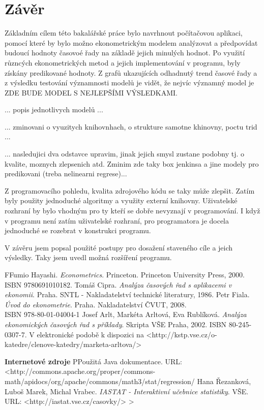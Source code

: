 \documentclass[a4paper,12pt,twoside]{scrreprt}
\begin{document}
\chapter*{Závěr}

Základním cílem této bakalářské práce bylo navrhnout počítačovou aplikaci, pomocí které by bylo možno ekonometrickým modelem analýzovat a předpovídat budoucí hodnoty časovoé řady na základě jejich minulých hodnot. Po využití různcých ekonometrických metod a jejich implementování v programu, byly získány predikované hodnoty. Z grafů ukazujících odhadnutý trend časové řady a z výsledku testování významnosti modelů je vidět, že nejvíc významný model je ZDE BUDE MODEL S NEJLEPŠÍMI VÝSLEDKAMI. 

... popis jednotlivych modelů ... 

... zminovani o vyuzitych knihovnhach, o strukture samotne khinovny, poctu trid ... 

... nasledujici dva odstavce upravim, jinak jejich smysl zustane podobny tj. o kvalite, moznych zlepsenich atd. Zminim zde taky box jenkinsa a jine modely pro predikovani (treba nelinearni regrese)... 

Z programovacího pohledu, kvalita zdrojového kódu se taky může zlepšit. Zatím byly použity jednoduché algoritmy a využity externí knihovny. Uživatelské rozhraní by bylo vhodným pro ty kteří se dobře nevyznají v programování. I když v programu není zatím uživatelské rozhraní, pro programatora je docela jednoduché se rozebrat v konstrukci programu. 

V závěru jsem popsal použité postupy pro dosažení staveného cíle a jeich výsledky. Taky jsem uvedl možná rozšíření programu. 

\clearpage
{} %
\begin{thebibliography}{99}   
	\bibitem FFumio Hayashi. \emph{Econometrics}. Princeton. Princeton University Press, 2000. ISBN 9780691010182.
	 Tomáš Cipra. \emph{Analýza časových řad s aplikacemi v ekonomii}. Praha. SNTL - Nakladatelství technické literatury, 1986.
	 Petr Fiala. \emph{Úvod do ekonometrie}. Praha. Nakladatelství ČVUT, 2008. \\ ISBN 978-80-01-04004-1
	 Josef Arlt, Markéta Arltová, Eva Rublíková. \emph{Analýza ekonomických časových řad s příklady}. Skripta VŠE Praha, 2002. ISBN 80-245-0307-7. V elektronické podobě k dispozici na <http://kstp.vse.cz/o-katedre/clenove-katedry/marketa-arltova/>

	\normalsize\textbf{\newline Internetové zdroje}
	\bibitem PPoužitá Java dokumentace. URL: <http://commons.apache.org/proper/commons-math/apidocs/org/apache/commons/math3/stat/regression/
	 Hana Řezanková, Luboš Marek, Michal Vrabec. \emph{IASTAT - Interaktivní učebnice statistiky}. VŠE. URL: <http://iastat.vse.cz/casovky/>
> 	
	
\end{thebibliography}
\end{document}
